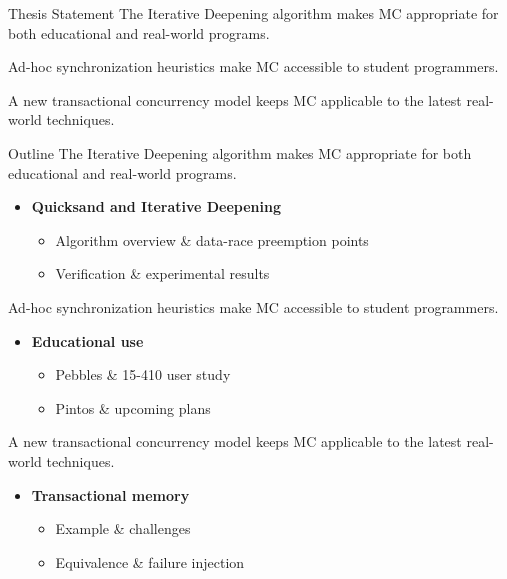\documentclass[xcolor=dvipsnames]{beamer}
\newcommand\hilight[2]{\color{#1}#2\color{black}}
\begin{document}
\begin{frame}{Thesis Statement}
	The Iterative Deepening algorithm makes MC appropriate for both educational and real-world programs.
	\vspace{4.14em}

	Ad-hoc synchronization heuristics make MC accessible to student programmers.
	\vspace{4.14em}

	A new transactional concurrency model keeps MC applicable to the latest real-world techniques.
	\vspace{4.14em}
\end{frame}
\begin{frame}{Outline}
	\hilight{gray}{The Iterative Deepening algorithm makes MC appropriate for both educational and real-world programs.} \\
	\begin{itemize}
		\item {\bf Quicksand and Iterative Deepening}
		\begin{itemize}
			\item Algorithm overview \& data-race preemption points
			\item Verification \& experimental results
		\end{itemize}
	\end{itemize}
	\hilight{gray}{Ad-hoc synchronization heuristics make MC accessible to student programmers.} \\
	\begin{itemize}
		\item {\bf Educational use}
		\begin{itemize}
			\item Pebbles \& 15-410 user study
			\item Pintos \& upcoming plans
		\end{itemize}
	\end{itemize}

	\hilight{gray}{A new transactional concurrency model keeps MC applicable to the latest real-world techniques.} \\
	\begin{itemize}
		\item {\bf Transactional memory}
		\begin{itemize}
			\item Example \& challenges
			\item Equivalence \& failure injection
		\end{itemize}
	\end{itemize}
\end{frame}
\end{document}
